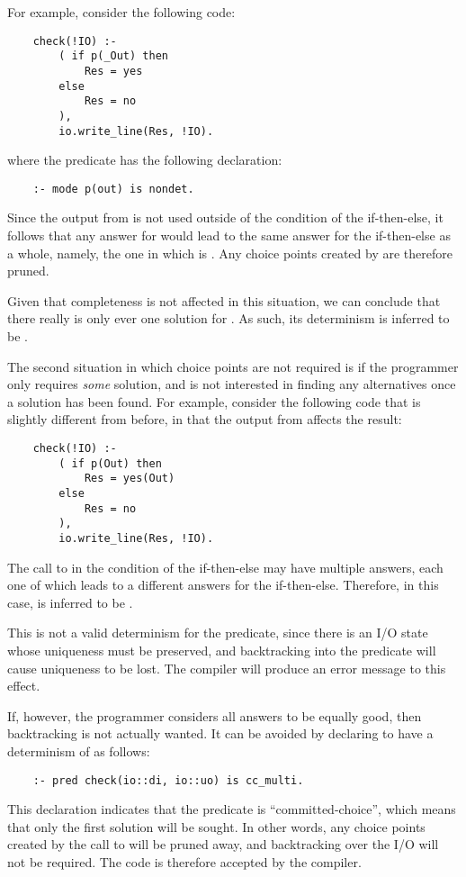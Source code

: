 For example, consider the following code:
\begin{verbatim}
    check(!IO) :-
        ( if p(_Out) then
            Res = yes
        else
            Res = no
        ),
        io.write_line(Res, !IO).
\end{verbatim}
where the predicate  has the following  declaration:
\begin{verbatim}
    :- mode p(out) is nondet.
\end{verbatim}
Since the output from  is not used
outside of the condition of the if-then-else,
it follows that any answer for 
would lead to the same answer for the if-then-else as a whole,
namely, the one in which  is .
Any choice points created by  are therefore pruned.

Given that completeness is not affected in this situation,
we can conclude that
there really is only ever one solution for .
As such, its determinism is inferred to be .

The second situation in which choice points are not required
is if the programmer only requires \emph{some} solution,
and is not interested in finding any alternatives
once a solution has been found.
For example, consider the following code
that is slightly different from before,
in that the output from  affects the result:
\begin{verbatim}
    check(!IO) :-
        ( if p(Out) then
            Res = yes(Out)
        else
            Res = no
        ),
        io.write_line(Res, !IO).
\end{verbatim}
The call to  in the condition of the if-then-else
may have multiple answers,
each one of which leads to a different answers for the if-then-else.
Therefore, in this case,  is inferred to be .

This is not a valid determinism for the predicate,
since there is an I/O state whose uniqueness must be preserved,
and backtracking into the predicate
will cause uniqueness to be lost.
The compiler will produce an error message to this effect.

If, however,
the programmer considers all answers to be equally good,
then backtracking is not actually wanted.
It can be avoided by declaring 
to have a determinism of  as follows:
\begin{verbatim}
    :- pred check(io::di, io::uo) is cc_multi.
\end{verbatim}
This declaration indicates that the predicate is ``committed-choice'',
which means that only the first solution will be sought.
In other words,
any choice points created by the call to  will be pruned away,
and backtracking over the I/O will not be required.
The code is therefore accepted by the compiler.

